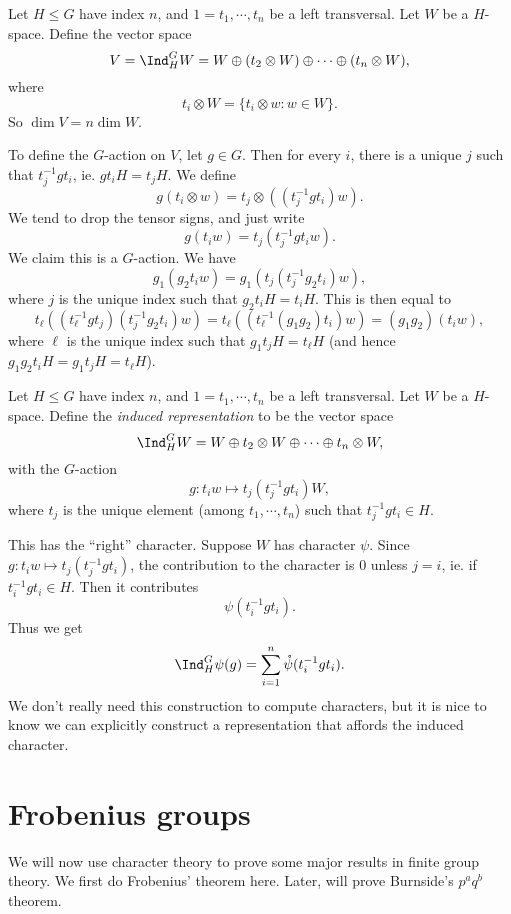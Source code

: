 \documentclass[a4paper]{article}
\begin{document}
Let $H \leq G$ have index $n$, and $1 = t_1, \cdots, t_n$ be a left transversal. Let $W$ be a $H$-space. Define the vector space
\[
  V = \Ind_H^G W = W \oplus (t_2 \otimes W) \oplus \cdots \oplus (t_n \otimes W),
\]
where
\[
  t_i \otimes W = \{t_i \otimes w: w \in W\}.
\]
So $\dim V = n \dim W$.

To define the $G$-action on $V$, let $g \in G$. Then for every $i$, there is a unique $j$ such that $t_j^{-1} g t_i$, ie. $gt_iH = t_j H$. We define
\[
  g(t_i \otimes w) = t_j \otimes ((t_j^{-1}gt_i) w).
\]
We tend to drop the tensor signs, and just write
\[
  g(t_i w) = t_j (t_j^{-1} g t_i w).
\]
We claim this is a $G$-action. We have
\[
  g_1(g_2 t_i w) = g_1(t_j(t_j^{-1} g_2 t_i)w),
\]
where $j$ is the unique index such that $g_2 t_i H = t_i H$. This is then equal to
\[
  t_\ell ((t_\ell^{-1} g t_j)(t_j^{-1} g_2 t_i) w) = t_\ell((t_\ell^{-1}(g_1g_2)t_i) w) = (g_1g_2)(t_i w),
\]
where $\ell$ is the unique index such that $g_1 t_j H = t_\ell H$ (and hence $g_1 g_2 t_i H = g_1 t_j H = t_\ell H$).

\begin{defi}
  Let $H \leq G$ have index $n$, and $1 = t_1, \cdots, t_n$ be a left transversal. Let $W$ be a $H$-space. Define the \emph{induced representation} to be the vector space
  \[
    \Ind_H^G W = W \oplus t_2 \otimes W \oplus \cdots \oplus t_n \otimes W,
  \]
  with the $G$-action
  \[
    g: t_i w \mapsto t_j (t_j^{-1} g t_i)W,
  \]
  where $t_j$ is the unique element (among $t_1, \cdots, t_n$) such that $t_j^{-1} gt_i \in H$.
\end{defi}

This has the ``right'' character. Suppose $W$ has character $\psi$. Since $g: t_i w \mapsto t_j (t_j^{-1} gt_i)$, the contribution to the character is $0$ unless $j = i$, ie. if $t_i^{-1} g t_i \in H$. Then it contributes
\[
  \psi (t_i^{-1} g t_i).
\]
Thus we get
\[
  \Ind_H^G \psi(g) = \sum_{i = 1}^n \mathring{\psi}(t_i^{-1} g t_i).
\]
We don't really need this construction to compute characters, but it is nice to know we can explicitly construct a representation that affords the induced character.

\section{Frobenius groups}
We will now use character theory to prove some major results in finite group theory. We first do Frobenius' theorem here. Later, will prove Burnside's $p^a q^b$ theorem.
\end{document}
